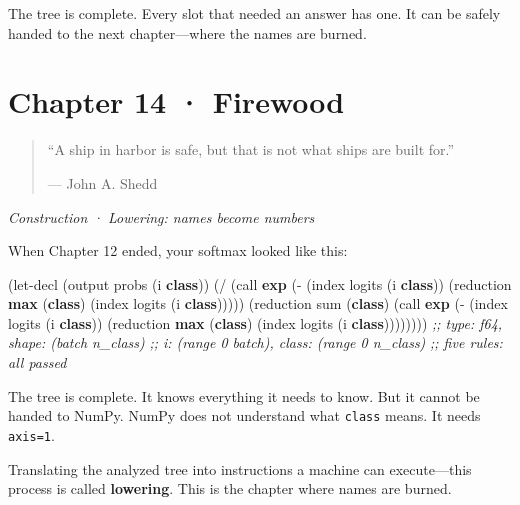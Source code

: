 \documentclass[11pt,titlepage]{article}
\newenvironment{Shaded}{}{}
\newcommand{\CommentTok}[1]{\textcolor[rgb]{0.38,0.63,0.69}{\textit{#1}}}
\newcommand{\KeywordTok}[1]{\textcolor[rgb]{0.00,0.44,0.13}{\textbf{#1}}}
\newcommand{\NormalTok}[1]{#1}
\newcommand{\OperatorTok}[1]{\textcolor[rgb]{0.40,0.40,0.40}{#1}}
\begin{document}
The tree is complete. Every slot that needed an answer has one. It can
be safely handed to the next chapter---where the names are burned.

\newpage

\hypertarget{chapter-14-firewood}{%
\section{Chapter 14 · Firewood}\label{chapter-14-firewood}}

\begin{quote}
``A ship in harbor is safe, but that is not what ships are built for.''

--- John A. Shedd
\end{quote}

\emph{Construction · Lowering: names become numbers}

\vspace{2em}

When Chapter 12 ended, your softmax looked like this:

\begin{Shaded}
\begin{Highlighting}[]
\NormalTok{(let-decl (output probs (i }\KeywordTok{class}\NormalTok{))}
\NormalTok{  (}\OperatorTok{/}\NormalTok{ (call }\KeywordTok{exp}\NormalTok{ (}\OperatorTok{-}\NormalTok{ (index logits (i }\KeywordTok{class}\NormalTok{))}
\NormalTok{                  (reduction }\KeywordTok{max}\NormalTok{ (}\KeywordTok{class}\NormalTok{)}
\NormalTok{                    (index logits (i }\KeywordTok{class}\NormalTok{)))))}
\NormalTok{     (reduction sum (}\KeywordTok{class}\NormalTok{)}
\NormalTok{       (call }\KeywordTok{exp}\NormalTok{ (}\OperatorTok{-}\NormalTok{ (index logits (i }\KeywordTok{class}\NormalTok{))}
\NormalTok{                    (reduction }\KeywordTok{max}\NormalTok{ (}\KeywordTok{class}\NormalTok{)}
\NormalTok{                      (index logits (i }\KeywordTok{class}\NormalTok{))))))))}
\CommentTok{;; type: f64, shape: (batch n_class)}
\CommentTok{;; i: (range 0 batch), class: (range 0 n_class)}
\CommentTok{;; five rules: all passed}
\end{Highlighting}
\end{Shaded}

The tree is complete. It knows everything it needs to know. But it
cannot be handed to NumPy. NumPy does not understand what \texttt{class}
means. It needs \texttt{axis=1}.

Translating the analyzed tree into instructions a machine can
execute---this process is called \textbf{lowering}. This is the chapter
where names are burned.
\end{document}
